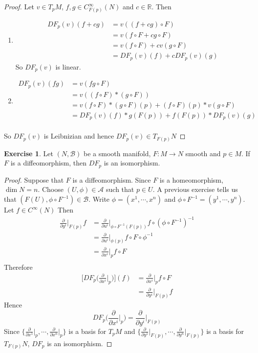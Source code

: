 \documentclass{book}
\theoremstyle{definition}
\newtheorem{ex}[definition]{Exercise}
\newcommand{\R}{\mathbb{R}}
\newcommand{\MA}{\mathcal{A}}
\newcommand{\MB}{\mathcal{B}}
\DeclareMathOperator*{\0}{\mbf{0}}
\DeclareMathOperator*{\1}{\mbf{1}}
\newcommand{\p}{\partial}
\begin{document}
	\begin{proof}
	Let $v \in T_pM$, $f,g \in C_{F(p)}^{\infty}(N)$ and $c \in \R$. Then 
	\begin{enumerate}
	\item 
	\begin{align*}
		DF_p(v)(f+cg) 
		&= v((f+cg) \circ F) \\
		&= v(f \circ F + c g \circ F) \\
		&= v(f \circ F) + cv(g \circ F) \\
		&= DF_p(v)(f) + c DF_p(v)(g)
	\end{align*}
	So $DF_p(v)$ is linear.
	\item 
	\begin{align*}
	DF_p(v)(fg) 
	&= v (fg \circ F) \\
	&= v((f \circ F)* (g \circ F)) \\
	&= v(f \circ F)*(g \circ F)(p) +  (f \circ F)(p)* v(g \circ F) \\
	&= DF_p(v)(f) * g(F(p)) + f(F(p))*DF_p(v)(g) \\
	\end{align*}
	\end{enumerate}
	So $DF_p(v)$ is Leibnizian and hence $DF_p(v) \in T_{F(p)}N$
	\end{proof}

	\begin{ex}
		Let $(N, \MB)$ be a smooth manifold, $F: M \rightarrow N$ smooth and $p \in M$. If $F$ is a diffeomorphism, then $DF_p$ is an isomorphism.
	\end{ex}
	
	\begin{proof}
		Suppose that $F$ is a diffeomorphism. Since $F$ is a homeomorphism, $\dim N = n$. Choose $(U, \phi) \in \MA$ such that $p \in U$. A previous exercise tells us that $(F(U), \phi \circ F^{-1}) \in \MB$. Write $\phi = (x^1, \cdots, x^n)$ and $\phi \circ F^{-1} = (y^1, \cdots, y^n)$. Let $f \in C^{\infty}(N)$ Then 
		\begin{align*}
			\frac{\p}{\p y^i} \bigg|_{F(p)} f
			&= 	\frac{\p}{\p u^i} \bigg|_{\phi \circ F^{-1} (F(p))} f \circ (\phi \circ F^{-1})^{-1} \\
			&= 	\frac{\p}{\p u^i} \bigg|_{\phi(p)} f \circ F \circ \phi^{-1} \\
			&= 	\frac{\p}{\p x^i} \bigg|_p f \circ F \\
		\end{align*}
		Therefore 
		\begin{align*}
			\bigg[ DF_p \bigg( \frac{\p}{\p x^i} \bigg|_p \bigg) \bigg] (f)
			&= \frac{\p}{\p x^i} \bigg|_p f \circ F \\
			&= \frac{\p}{\p y^i} \bigg|_{F(p)} f 
		\end{align*}
	Hence $$DF_p \bigg( \frac{\p}{\p x^i} \bigg|_p \bigg) = \frac{\p}{\p y^i} \bigg|_{F(p)}$$ 
	Since $\bigg \{\frac{\p}{\p x^1} \bigg|_p, \cdots, \frac{\p}{\p x^n} \bigg|_p \bigg \}$ is a basis for $T_pM$ and $\bigg \{\frac{\p}{\p y^1} \bigg|_{F(p)}, \cdots, \frac{\p}{\p y^n} \bigg|_{F(p)} \bigg \}$ is a basis for $T_{F(p)}N$, $DF_p$ is an isomorphism.
	\end{proof}
\end{document}
